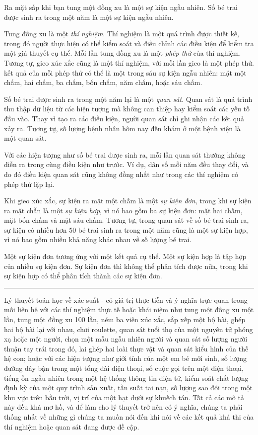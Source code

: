\documentclass[12pt]{article} %
\begin{document}
Ra mặt sấp khi bạn tung một đồng xu là một sự kiện ngẫu nhiên. Số bé trai được sinh ra trong một năm là một sự kiện ngẫu nhiên. 

Tung đồng xu là một \emph{thí nghiệm}. Thí nghiệm là một quá trình được thiết kế, trong đó người thực hiện có thể kiểm soát và điều chỉnh các điều kiện để kiểm tra một giả thuyết cụ thể. Mỗi lần tung đồng xu là một \emph{phép thử} của thí nghiệm. Tương tự, gieo xúc xắc cũng là một thí nghiệm, với mỗi lần gieo là một phép thử. kết quả của mỗi phép thử có thể là một trong sáu sự kiện ngẫu nhiên: mặt một chấm, hai chấm, ba chấm, bốn chấm, năm chấm, hoặc sáu chấm.

Số bé trai được sinh ra trong một năm lại là một \emph{quan sát}. Quan sát là quá trình thu thập dữ liệu từ các hiện tượng mà không can thiệp hay kiểm soát các yếu tố đầu vào. Thay vì tạo ra các điều kiện, người quan sát chỉ ghi nhận các kết quả xảy ra. Tương tự, số lượng bệnh nhân hôm nay đến khám ở một bệnh viện là một quan sát. 

Với các hiện tượng như số bé trai được sinh ra, mỗi lần quan sát thường không diễn ra trong cùng điều kiện như trước. Ví dụ, dân số mỗi năm đều thay đổi, và do đó điều kiện quan sát cũng không đồng nhất như trong các thí nghiệm có phép thử lặp lại.

Khi gieo xúc xắc, sự kiện ra mặt một chấm là một \emph{sự kiện đơn}, trong khi sự kiện ra mặt chẵn là một \emph{sự kiện hợp}, vì nó bao gồm ba sự kiện đơn: mặt hai chấm, mặt bốn chấm và mặt sáu chấm. Tương tự, trong quan sát về số bé trai sinh ra, sự kiện có nhiều hơn 50 bé trai sinh ra trong một năm cũng là một sự kiện hợp, vì nó bao gồm nhiều khả năng khác nhau về số lượng bé trai.

Một sự kiện đơn tương ứng với một kết quả cụ thể. Một sự kiện hợp là tập hợp của nhiều sự kiện đơn. Sự kiện đơn thì không thể phân tích được nữa, trong khi sự kiện hợp có thể phân tích thành các sự kiện đơn.

\noindent\rule{\textwidth}{.4pt}

Lý thuyết toán học về xác suất - có giá trị thực tiễn và ý nghĩa trực quan trong mối liên hệ với các thí nghiệm thực tế hoặc khái niệm như tung một đồng xu một lần, tung một đồng xu 100 lần, ném ba viên xúc xắc, sắp xếp một bộ bài, ghép hai bộ bài lại với nhau, chơi roulette, quan sát tuổi thọ của một nguyên tử phóng xạ hoặc một người, chọn một mẫu ngẫu nhiên người và quan sát số lượng người thuận tay trái trong đó, lai ghép hai loài thực vật và quan sát kiểu hình của thế hệ con; hoặc với các hiện tượng như giới tính của một em bé mới sinh, số lượng đường dây bận trong một tổng đài điện thoại, số cuộc gọi trên một điện thoại, tiếng ồn ngẫu nhiên trong một hệ thống thông tin điện tử, kiểm soát chất lượng định kỳ của một quy trình sản xuất, tần suất tai nạn, số lượng sao đôi trong một khu vực trên bầu trời, vị trí của một hạt dưới sự khuếch tán. Tất cả các mô tả này đều khá mơ hồ, và để làm cho lý thuyết trở nên có ý nghĩa, chúng ta phải thống nhất về những gì chúng ta muốn nói đến khi nói về các kết quả khả thi của thí nghiệm hoặc quan sát đang được đề cập.
\end{document}

